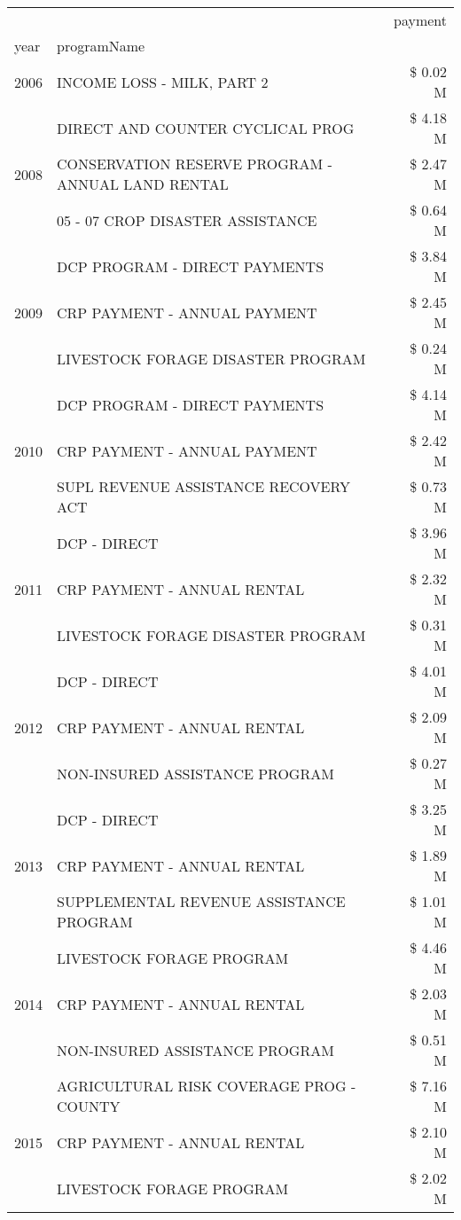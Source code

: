 \begin{tabular}{llr}
\toprule
 &  & payment \\
year & programName &  \\
\midrule
2006 & INCOME LOSS - MILK, PART 2 & \$ 0.02 M \\
\cline{1-3}
\multirow[t]{3}{*}{2008} & DIRECT AND COUNTER CYCLICAL PROG & \$ 4.18 M \\
 & CONSERVATION RESERVE PROGRAM - ANNUAL LAND RENTAL & \$ 2.47 M \\
 & 05 - 07 CROP DISASTER ASSISTANCE & \$ 0.64 M \\
\cline{1-3}
\multirow[t]{3}{*}{2009} & DCP PROGRAM - DIRECT PAYMENTS & \$ 3.84 M \\
 & CRP PAYMENT - ANNUAL PAYMENT & \$ 2.45 M \\
 & LIVESTOCK FORAGE DISASTER  PROGRAM & \$ 0.24 M \\
\cline{1-3}
\multirow[t]{3}{*}{2010} & DCP PROGRAM - DIRECT PAYMENTS & \$ 4.14 M \\
 & CRP PAYMENT - ANNUAL PAYMENT & \$ 2.42 M \\
 & SUPL REVENUE ASSISTANCE RECOVERY ACT & \$ 0.73 M \\
\cline{1-3}
\multirow[t]{3}{*}{2011} & DCP - DIRECT & \$ 3.96 M \\
 & CRP PAYMENT - ANNUAL RENTAL & \$ 2.32 M \\
 & LIVESTOCK FORAGE DISASTER PROGRAM & \$ 0.31 M \\
\cline{1-3}
\multirow[t]{3}{*}{2012} & DCP - DIRECT & \$ 4.01 M \\
 & CRP PAYMENT - ANNUAL RENTAL & \$ 2.09 M \\
 & NON-INSURED ASSISTANCE PROGRAM & \$ 0.27 M \\
\cline{1-3}
\multirow[t]{3}{*}{2013} & DCP - DIRECT & \$ 3.25 M \\
 & CRP PAYMENT - ANNUAL RENTAL & \$ 1.89 M \\
 & SUPPLEMENTAL REVENUE ASSISTANCE PROGRAM & \$ 1.01 M \\
\cline{1-3}
\multirow[t]{3}{*}{2014} & LIVESTOCK FORAGE PROGRAM & \$ 4.46 M \\
 & CRP PAYMENT - ANNUAL RENTAL & \$ 2.03 M \\
 & NON-INSURED ASSISTANCE PROGRAM & \$ 0.51 M \\
\cline{1-3}
\multirow[t]{3}{*}{2015} & AGRICULTURAL RISK COVERAGE PROG - COUNTY & \$ 7.16 M \\
 & CRP PAYMENT - ANNUAL RENTAL & \$ 2.10 M \\
 & LIVESTOCK FORAGE PROGRAM & \$ 2.02 M \\

\end{tabular}
